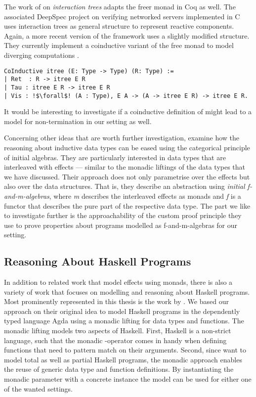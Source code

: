 The work of \citet{koh2019interaction} on \emph{interaction trees} adapts the freer monad in Coq as well.
The associated DeepSpec project on verifying networked servers implemented in C uses interaction trees as general structure to represent reactive components.
Again,  a more recent version of the framework uses a slightly modified structure.
They currently implement a coinductive variant of the free monad to model diverging computations \citep{xia2019interaction}.

\begin{verbatim}
CoInductive itree (E: Type -> Type) (R: Type) :=
| Ret  : R -> itree E R
| Tau : itree E R -> itree E R
| Vis : !$\forall$! (A : Type), E A -> (A -> itree E R) -> itree E R.
\end{verbatim}

It would be interesting to investigate if a coinductive definition of  might lead to a model for non\--termination in our setting as well.

Concerning other ideas that are worth further investigation, \citet{atkey2015interleaving} examine how the reasoning about
inductive data types can be eased using the categorical principle of initial algebras.
They are particularly interested in data types that are interleaved with effects --- similar to the monadic liftings of the data types that we have discussed.
Their approach does not only parametrise over the effects but also over the data structures.
That is, they describe an abstraction using \emph{initial f\--and\--m\--algebras}, where \emph{m} describes the interleaved effects as monads and \emph{f} is a functor that describes the pure part of the respective data type.
The part we like to investigate further is the approachability of the custom proof principle they use to prove properties about programs modelled as f\--and\--m\--algebras for our setting.

\subsection{Reasoning About Haskell Programs}

In addition to related work that model effects using monads, there is also a variety of work that focuses on modelling and reasoning about Haskell programs.
Most prominently represented in this thesis is the work by \citet{abel2005verifying}.
We based our approach on their original idea to model Haskell programs in the dependently typed language Agda using a monadic lifting for data types and functions.
The monadic lifting models two aspects of Haskell.
First, Haskell is a non\--strict language, such that the monadic \hinl{>>=}\--operator comes in handy when defining functions that need to pattern match on their arguments.
Second, since \citeauthor{abel2005verifying} want to model total as well as partial Haskell programs, the monadic approach enables the reuse of generic data type and function definitions.
By instantiating the monadic parameter with a concrete instance the model can be used for either one of the wanted settings.

